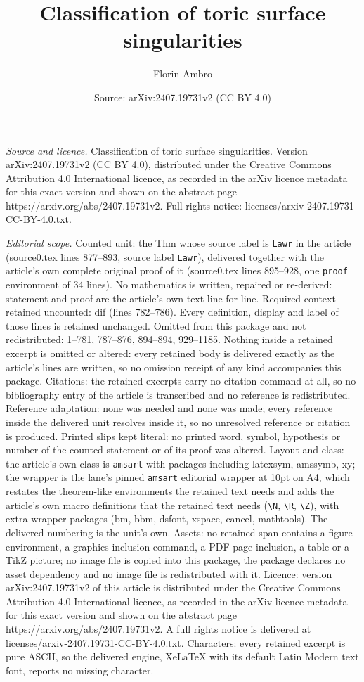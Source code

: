 \documentclass[10pt,a4paper]{amsart}
\title[Classification of toric surface singularities]{Classification of toric surface singularities}
\author{Florin Ambro}
\date{Source: arXiv:2407.19731v2 (CC BY 4.0)}
\begin{document}
\maketitle

\noindent\emph{Source and licence.} Classification of toric surface singularities. Version arXiv:2407.19731v2 (CC BY 4.0), distributed under the Creative Commons Attribution 4.0 International licence, as recorded in the arXiv licence metadata for this exact version and shown on the abstract page https://arxiv.org/abs/2407.19731v2. Full rights notice: licenses/arxiv-2407.19731-CC-BY-4.0.txt.\par\smallskip

\noindent\textit{Editorial scope.} Counted unit: the Thm whose source label is \texttt{Lawr} in the article (source0.tex lines 877--893, source label \texttt{Lawr}), delivered together with the article's own complete original proof of it (source0.tex lines 895--928, one \texttt{proof} environment of 34 lines). No mathematics is written, repaired or re-derived: statement and proof are the article's own text line for line. Required context retained uncounted: dif (lines 782--786). Every definition, display and label of those lines is retained unchanged. Omitted from this package and not redistributed: 1--781, 787--876, 894--894, 929--1185. Nothing inside a retained excerpt is omitted or altered: every retained body is delivered exactly as the article's lines are written, so no omission receipt of any kind accompanies this package. Citations: the retained excerpts carry no citation command at all, so no bibliography entry of the article is transcribed and no reference is redistributed. Reference adaptation: none was needed and none was made; every reference inside the delivered unit resolves inside it, so no unresolved reference or citation is produced. Printed slips kept literal: no printed word, symbol, hypothesis or number of the counted statement or of its proof was altered. Layout and class: the article's own class is \texttt{amsart} with packages including latexsym, amssymb, xy; the wrapper is the lane's pinned \texttt{amsart} editorial wrapper at 10pt on A4, which restates the theorem-like environments the retained text needs and adds the article's own macro definitions that the retained text needs (\texttt{\textbackslash N}, \texttt{\textbackslash R}, \texttt{\textbackslash Z}), with extra wrapper packages (bm, bbm, dsfont, xspace, cancel, mathtools). The delivered numbering is the unit's own. Assets: no retained span contains a figure environment, a graphics-inclusion command, a PDF-page inclusion, a table or a TikZ picture; no image file is copied into this package, the package declares no asset dependency and no image file is redistributed with it. Licence: version arXiv:2407.19731v2 of this article is distributed under the Creative Commons Attribution 4.0 International licence, as recorded in the arXiv licence metadata for this exact version and shown on the abstract page https://arxiv.org/abs/2407.19731v2. A full rights notice is delivered at licenses/arxiv-2407.19731-CC-BY-4.0.txt. Characters: every retained excerpt is pure ASCII, so the delivered engine, XeLaTeX with its default Latin Modern text font, reports no missing character.
\end{document}
